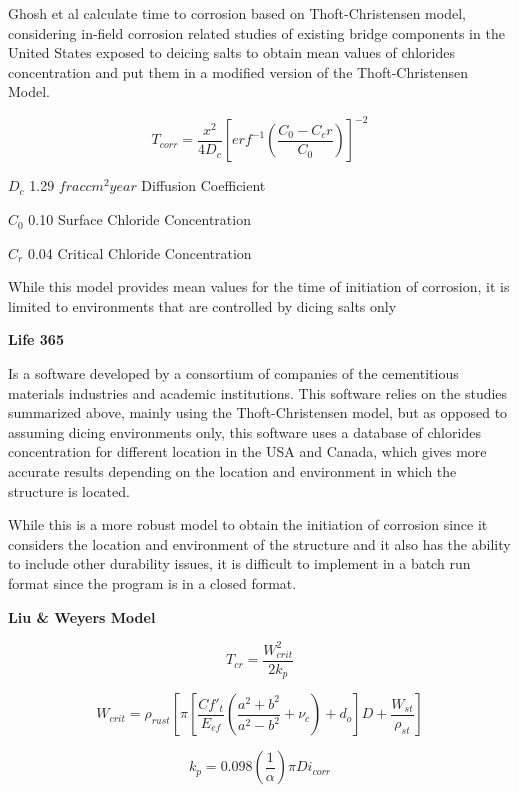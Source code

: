 Ghosh et al calculate time to corrosion based on Thoft-Christensen model, considering in-field corrosion related studies of existing bridge components in the United States exposed to deicing salts to obtain mean values of chlorides concentration and put them in a modified version of the Thoft-Christensen Model.

\begin{equation}
T_{corr}=\frac{x^2}{4 D_c} \left[erf^{-1} \left(\frac{C_0-C_cr}{C_0} \right) \right]^{-2}
  \label{eq.ten}
\end{equation} 

$D_c$ 1.29 $frac{cm^2}{year}$ Diffusion Coefficient 

$C_0$ 0.10 Surface Chloride Concentration

$C_r$ 0.04 Critical Chloride Concentration

While this model provides mean values for the time of initiation of corrosion, it is limited to environments that are controlled by dicing salts only
 
\textbf{Life 365}

Is a software developed by a consortium of companies of the cementitious materials industries and academic institutions. This software relies on the studies summarized above, mainly using the Thoft-Christensen model, but as opposed to assuming dicing environments only, this software uses a database of chlorides concentration for different location in the USA and Canada, which gives more accurate results depending on the location and environment in which the structure is located.

While this is a more robust model to obtain the initiation of corrosion since it considers the location and environment of the structure and it also has the ability to include other durability issues, it is difficult to implement in a batch run format since the program is in a closed format.

\textbf{Liu \& Weyers Model}

\begin{equation}
  T_{cr}=\frac{W_{crit}^2}{2k_p}
  \label{eq.two}
\end{equation} 

\begin{equation}
  W_{crit}=\rho_{rust} \left[ \pi \left[ \frac{C f'_t}{E_{ef}} \left( \frac{a^2+b^2}{a^2-b^2}+\nu_c \right)+d_o \right] D+ \frac{W_{st}}{\rho_{st}} \right]
  \label{eq.three}
\end{equation} 

\begin{equation}
  k_p=0.098 (\frac{1}{\alpha})\pi Di_{corr}
  \label{eq.four}
\end{equation} 

